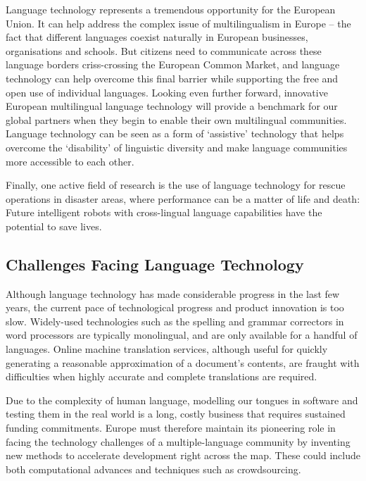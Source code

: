 \begin{multicols}{2}
Language technology represents a tremendous opportunity for the European Union.  It can help address the complex issue of multilingualism in Europe -- the fact that different languages coexist naturally in European businesses, organisations and schools. But citizens need to communicate across these language borders criss-crossing the European Common Market, and language technology can help overcome this final barrier while supporting the free and open use of individual languages. Looking even further forward, innovative European multilingual language technology will provide a benchmark for our global partners when they begin to enable their own multilingual communities.  Language technology can be seen as a form of ‘assistive’ technology that helps overcome the ‘disability’ of linguistic diversity and make language communities more accessible to each other.

Finally, one active field of research is the use of language technology for rescue operations in disaster areas, where performance can be a matter of life and death: Future intelligent robots with cross-lingual language capabilities have the potential to save lives.

\subsection{Challenges Facing Language Technology}

Although language technology has made considerable progress in the last few years, the current pace of technological progress and product innovation is too slow. Widely-used technologies such as the spelling and grammar correctors in word processors are typically monolingual, and are only available for a handful of languages. Online machine translation services, although useful for quickly generating a reasonable approximation of a document’s contents, are fraught with difficulties when highly accurate and complete translations are required.


Due to the complexity of human language, modelling our tongues in software and testing them in the real world is a long, costly business that requires sustained funding commitments. Europe must therefore maintain its pioneering role in facing the technology challenges of a multiple-language community by inventing new methods to accelerate development right across the map. These could include both computational advances and techniques such as crowdsourcing.


\end{multicols}
